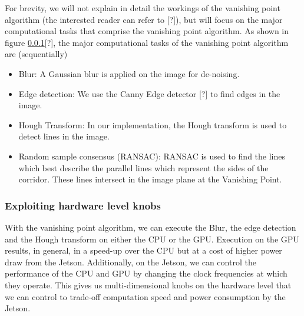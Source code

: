 For brevity, we will not explain in detail the workings of the vanishing point algorithm (the interested reader can refer to \cite{}[?]), but will focus on the major computational tasks that comprise the vanishing point algorithm. As shown in figure \ref{}[?], the major computational tasks of the vanishing point algorithm are (sequentially)

\begin{itemize}
\item Blur: A Gaussian blur is applied on the image for de-noising.
\item Edge detection: We use the Canny Edge detector \cite{}[?] to find edges in the image.
\item Hough Transform: In our implementation, the Hough transform is used to detect lines in the image.
\item Random sample consensus (RANSAC): RANSAC is used to find the lines which best describe the parallel lines which represent the sides of the corridor. These lines intersect in the image plane at the Vanishing Point.
\end{itemize}

\subsubsection{Exploiting hardware level knobs}

With the vanishing point algorithm, we can execute the Blur, the edge detection and the Hough transform on either the CPU or the GPU. Execution on the GPU results, in general, in a speed-up over the CPU but at a cost of higher power draw from the Jetson. Additionally, on the Jetson, we can control the performance of the CPU and GPU by changing the clock frequencies at which they operate. This gives us multi-dimensional knobs on the hardware level that we can control to trade-off computation speed and power consumption by the Jetson.




